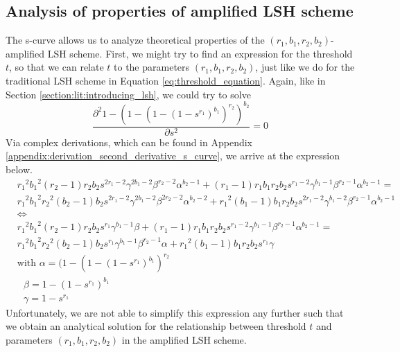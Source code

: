 \subsection{Analysis of properties of amplified LSH scheme}
The s-curve allows us to analyze theoretical properties of the $(r_1,b_1,r_2,b_2)$-amplified LSH scheme. First, we might try to find an expression for the threshold $t$, so that we can relate $t$ to the parameters $(r_1,b_1,r_2,b_2)$, just like we do for the traditional LSH scheme in Equation \ref{eq:threshold_equation}. Again, like in Section \ref{section:lit:introducing_lsh}, we could try to solve 
\begin{equation}
    \frac{\partial^2 1 - (1- (1 - (1-s^{r_1})^{b_1})^{r_2})^{b_2} }{\partial s^2} = 0
    \label{eq:identifying_equation_amplified}
\end{equation}
 Via complex derivations, which can be found in Appendix \ref{appendix:derivation_second_derivative_s_curve}, we arrive at the expression below.
\begin{equation}
    \begin{aligned}
        &{r_1}^{2} {b_1}^{2}({r_2}-1) {r_2} {b_2} s^{2 {r_1}-2}\gamma^{2 {b_1}-2}\beta^{{r_2}-2}\alpha^{{b_2}-1} + ({r_1}-1) {r_1} {b_1} {r_2} {b_2} s^{{r_1}-2}\gamma^{{b_1}-1}\beta^{{r_2}-1}\alpha^{{b_2}-1}  = \\
        &{r_1}^{2} {b_1}^{2} {r_2}^{2}({b_2}-1) {b_2} s^{2 {r_1}-2}\gamma^{2 {b_1}-2}\beta^{2 {r_2}-2}\alpha^{{b_2}-2} + {r_1}^{2}({b_1}-1) {b_1} {r_2} {b_2} s^{2 {r_1}-2}\gamma^{{b_1}-2}\beta^{{r_2}-1}\alpha^{{b_2}-1} \\ 
        &\Leftrightarrow\\
        & {r_1}^{2} {b_1}^{2}({r_2}-1) {r_2} {b_2} s^{r_1}\gamma^{{b_1}-1}\beta + ({r_1}-1) {r_1} {b_1} {r_2} {b_2} s^{{r_1}-2}\gamma^{{b_1}-1}\beta^{{r_2}-1}\alpha^{{b_2}-1} = \\
        & {r_1}^{2} {b_1}^{2} {r_2}^{2}({b_2}-1) {b_2} s^{r_1}\gamma^{{b_1}-1}\beta^{{r_2}-1}\alpha + {r_1}^{2}({b_1}-1) {b_1} {r_2} {b_2} s^{r_1}\gamma\\
        &\text{with } \alpha = (1 - (1- (1 - s^{r_1})^{b_1})^{r_2} \\
        &\text{     } \beta = 1- (1 - s^{r_1})^{b_1}\\
        &\text{     } \gamma = 1 - s^{r_1} 
    \end{aligned}
\end{equation}
Unfortunately, we are not able to simplify this expression any further such that we obtain an analytical solution for the relationship between threshold $t$ and parameters $(r_1,b_1,r_2,b_2)$ in the amplified LSH scheme. 

